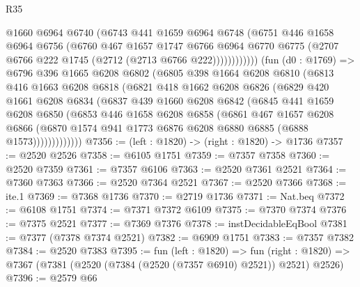 \begin{lexlean}{R35}
\begin{coremodule}
                    @1660
                    @6964
                    @6740
                    (@6743
                      @441
                      @1659
                      @6964
                      @6748
                      (@6751
                        @446
                        @1658
                        @6964
                        @6756
                        (@6760
                          @467
                          @1657
                          @1747
                          @6766
                          @6964
                          @6770
                          @6775
                          (@2707 @6766 @222 @1745 (@2712 (@2713 @6766 @222))))))))))))
        (fun (d0 : @1769) =>
        @6796
          @396
          @1665
          @6208
          @6802
          (@6805
            @398
            @1664
            @6208
            @6810
            (@6813
              @416
              @1663
              @6208
              @6818
              (@6821
                @418
                @1662
                @6208
                @6826
                (@6829
                  @420
                  @1661
                  @6208
                  @6834
                  (@6837
                    @439
                    @1660
                    @6208
                    @6842
                    (@6845
                      @441
                      @1659
                      @6208
                      @6850
                      (@6853
                        @446
                        @1658
                        @6208
                        @6858
                        (@6861
                          @467
                          @1657
                          @6208
                          @6866
                          (@6870 @1574 @941 @1773 @6876 @6208 @6880 @6885 (@6888 @1573)))))))))))))
@7356 := (left : @1820) -> (right : @1820) -> @1736
@7357 := @2520 @2526
@7358 := @6105 @1751
@7359 := @7357 @7358
@7360 := @2520 @7359
@7361 := @7357 @6106
@7363 := @2520 @7361 @2521
@7364 := @7360 @7363
@7366 := @2520 @7364 @2521
@7367 := @2520 @7366
@7368 := ite.{1}
@7369 := @7368 @1736
@7370 := @2719 @1736
@7371 := Nat.beq
@7372 := @6108 @1751
@7374 := @7371 @7372 @6109
@7375 := @7370 @7374
@7376 := @7375 @2521
@7377 := @7369 @7376
@7378 := instDecidableEqBool
@7381 := @7377 (@7378 @7374 @2521)
@7382 := @6909 @1751
@7383 := @7357 @7382
@7384 := @2520 @7383
@7395 := fun (left : @1820) =>
  fun (right : @1820) => @7367 (@7381 (@2520 (@7384 (@2520 (@7357 @6910) @2521)) @2521) @2526)
@7396 := @2579 @66

\end{coremodule}
\end{lexlean}
